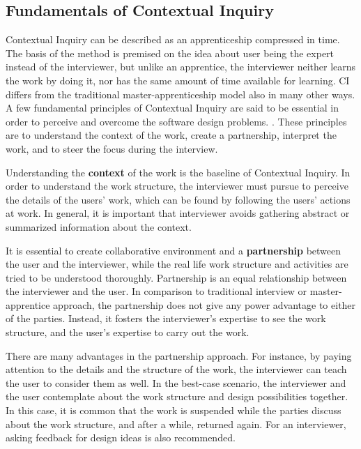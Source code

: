 \documentclass[12pt,a4paper,oneside,pdftex]{report}
\begin{document}
\subsection{Fundamentals of Contextual Inquiry}
Contextual Inquiry can be described as an apprenticeship compressed in time. The basis of the method is premised on the idea about user being the expert instead of the interviewer, but unlike an apprentice, the interviewer neither learns the work by doing it, nor has the same amount of time available for learning. \citep{RefWorks:21} CI differs from the traditional master-apprenticeship model also in many other ways. A few fundamental principles of Contextual Inquiry are said to be essential in order to perceive and overcome the software design problems. \citep{RefWorks:21}. These principles are to understand the context of the work, create a partnership, interpret the work, and to steer the focus during the interview. \citep{RefWorks:21, RefWorks:28}

Understanding the \textbf{context} of the work is the baseline of Contextual Inquiry. In order to understand the work structure, the interviewer must pursue to perceive the details of the users' work, which can be found by following the users' actions at work. In general, it is important that interviewer avoids gathering abstract or summarized information about the context.\citep{RefWorks:21}

It is essential to create collaborative environment and a \textbf{partnership} between the user and the interviewer, while the real life work structure and activities are tried to be understood thoroughly. Partnership is an equal relationship between the interviewer and the user. In comparison to traditional interview or master-apprentice approach, the partnership does not give any power advantage to either of the parties. Instead, it fosters the interviewer's expertise to see the work structure, and the user's expertise to carry out the work. 
\citep{RefWorks:21}

There are many advantages in the partnership approach. For instance, by paying attention to the details and the structure of the work, the interviewer can teach the user to consider them as well. In the best-case scenario, the interviewer and the user contemplate about the work structure and design possibilities together. In this case, it is common that the work is suspended while the parties discuss about the work structure, and after a while, returned again. For an interviewer, asking feedback for design ideas is also recommended.\citep{RefWorks:21}
\end{document}
